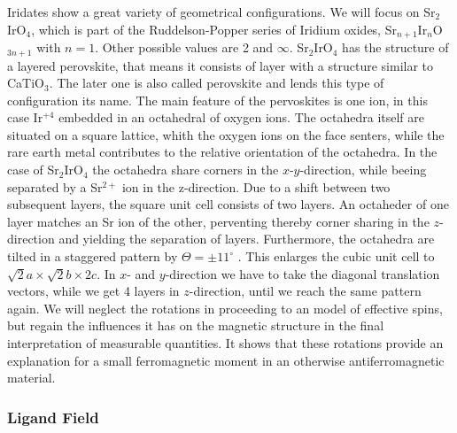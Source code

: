 \documentclass[a4paper,10pt]{report}
\begin{document}
Iridates show a great variety of geometrical configurations. 
We will focus on Sr$_2$IrO$_4$, which is part of the Ruddelson-Popper series of Iridium oxides, Sr$_{n+1}$Ir$_{n}$O$_{3n+1}$ with $n =1$. 
Other possible values are 2 and $\infty$.
Sr$_2$IrO$_4$ has the structure of a layered perovskite, that means it consists of layer with a structure similar to CaTiO$_3$.
The later one is also called perovskite and lends this type of configuration its name.
The main feature of the pervoskites is one ion, in this case Ir$^{+4}$  embedded in an octahedral of oxygen ions.
The octahedra itself are situated on a square lattice, whith the oxygen ions on the face senters,
while the rare earth metal contributes to the relative orientation of the octahedra. 
%
In the case of Sr$_2$IrO$_4$ the octahedra share corners in the $x$-$y$-direction, while beeing separated by a Sr$^{2+}$ ion in the z-direction.
Due to a shift between two subsequent layers, the square unit cell consists of two layers. 
An octaheder of one layer matches an Sr ion of the other, perventing thereby corner sharing in the $z$-direction and yielding the separation of layers. 
%
Furthermore, the octahedra are tilted in a staggered pattern by $\Theta = \pm 11^{\circ}$ \cite{PhysRevB.49.9198}.
This enlarges the cubic unit cell to $\sqrt2 a\times\sqrt 2b \times 2c$.
In $x$- and $y$-direction we have to take the diagonal translation vectors, while we get 4 layers in $z$-direction, until we reach the same pattern again. 
%
We will neglect the rotations in proceeding to an model of effective spins, but regain the influences it has on the magnetic structure in the final interpretation of 
measurable quantities. It shows that these rotations provide an explanation for a small ferromagnetic moment in an otherwise antiferromagnetic material. 

\subsubsection{Ligand Field}
\end{document}
